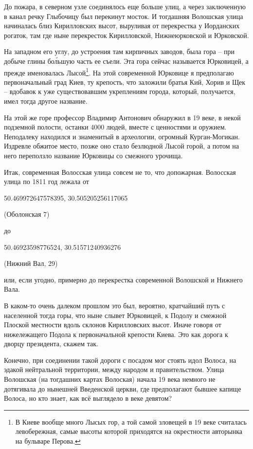 \documentclass[a5paper,11pt,openany]{article}
\begin{document}
До пожара, в северном узле соединялось еще больше улиц, а через заключенную в канал речку Глыбочицу был перекинут мосток. И тогдашняя Волошская улица начиналась близ Кирилловских высот, выруливая от перекрестка у Иорданских рогаток, там где ныне перекресток Кирилловской, Нижнеюрковской и Юрковской.

На западном его углу, до устроения там кирпичных заводов, была гора – при добыче глины бо\'льшую часть ее съели. Эта гора сейчас называется Юрковицей, а прежде именовалась Лысой\footnote{В Киеве вообще много Лысых гор, а той самой зловещей в 19 веке считалась левобережная, самые высоты которой приходятся на окрестности авторынка на бульваре Перова.}. На этой современной Юрковице я предполагаю первоначальный град Киев, ту крепость, что заложили братья Кий, Хорив и Щек – вдобавок к уже существовавшим укреплениям города, который, получается, имел тогда другое название.

   На этой же горе профессор Владимир Антонович обнаружил в 19 веке, в некой подземной полости, останки 4000 людей, вместе с ценностями и оружием. Неподалеку находился и знаменитый в археологии, огромный Курган-Могикан. Издревле обжитое место, позже оно стало безлюдной Лысой горой, а потом на него переползло название Юрковицы со смежного урочища.

   Итак, современная Волосская улица совсем не то, что допожарная. Волосская улица по 1811 год лежала от 

50.469972647578395, 30.505205256117065

(Оболонская 7)

до 

50.46923598776524, 30.51571240936276

(Нижний Вал, 29)

или, если угодно, примерно до перекрестка современной Волошской и Нижнего Вала.

   В каком-то очень далеком прошлом это был, вероятно, кратчайший путь с населенной тогда горы, что ныне слывет Юрковицей, к Подолу и смежной Плоской местности вдоль склонов Кирилловских высот. Иначе говоря от нижележащего Подола к первоначальной крепости Киева. Это как дорога  к дворцу президента, скажем так.

Конечно, при соединении такой дороги с посадом мог стоять идол Волоса, на эдакой нейтральной территории, между народом и правительством. Улица Волошская (на тогдашних картах Волоская) начала 19 века немного не дотягивала до нынешней Введенской церкви, где предполагают бывшее капище Волоса, но кто знает, как всё выглядело в веке девятом?
\end{document}
